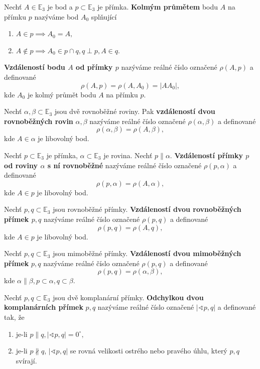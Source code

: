 \begin{definition}
    Nechť $A\in \mathbb E_3$ je bod a $p \subset \mathbb E_3$ je přímka.
    \textbf{Kolmým průmětem} bodu $A$ na přímku $p$ nazýváme bod $A_0$
    splňující
    \begin{enumerate}[$i.$]
    \item $A\in p \implies A_0=A,$
    \item $A\notin p \implies A_0 \in p \cap q, q \perp p, A \in q.$
    \end{enumerate}
    \textbf{Vzdáleností bodu $A$ od přímky $p$} nazýváme reálné číslo označené
    $\rho(A,p) $ a definované
    $$\rho(A,p) = \rho(A, A_0) = |AA_0|,$$
    kde $A_0$ je kolmý průmět bodu $A$ na přímku $p.$
\end{definition}

\begin{definition}
    Nechť $\alpha, \beta \subset \mathbb E_3$ jsou dvě rovnoběžné roviny. Pak
    \textbf{vzdáleností dvou rovnoběžných rovin} $\alpha, \beta$ nazýváme reálné
    číslo označené $\rho(\alpha, \beta)$ a definované
    $$\rho(\alpha, \beta)=\rho(A,\beta),$$
    kde $A\in\alpha$ je libovolný bod.
\end{definition}

\begin{definition}
    Nechť $p \subset \mathbb E_3$ je přímka, $\alpha \subset \mathbb E_3$ je rovina.
    Nechť $p\parallel \alpha.$ \textbf{Vzdáleností přímky $p$ od roviny $\alpha$
    s ní rovnoběžné} nazýváme reálné číslo označené $\rho(p,\alpha)$ a definované
    $$\rho(p,\alpha)=\rho(A,\alpha),$$
    kde $A\in p$ je libovolný bod.
\end{definition}

\begin{definition}
    Nechť $p,q \subset \mathbb E_3$ jsou rovnoběžné přímky. \textbf{Vzdáleností
    dvou rovnoběžných přímek $p,q$} nazýváme reálné číslo označené $\rho(p,q)$ a
    definované
    $$\rho(p,q) = \rho(A,q),$$
    kde $A\in p$ je libovolný bod.
\end{definition}

\begin{definition}
    Nechť $p,q \subset \mathbb E_3$ jsou mimoběžné přímky. \textbf{Vzdáleností dvou
    mimoběžných přímek} $p,q$ nazýváme reálné číslo označené $\rho(p,q)$ a definované
    $$\rho(p,q)=\rho(\alpha, \beta),$$
    kde $\alpha \parallel \beta, p \subset \alpha, q \subset \beta.$
\end{definition}

\begin{definition}
    Nechť $p,q \subset \mathbb E_3$ jsou dvě komplanární přímky. \textbf{Odchylkou
    dvou komplanárních přímek} $p,q$ nazýváme reálné číslo označené $|\sphericalangle
    p,q|$ a definované tak, že
    \begin{enumerate}[$i.$]
    \item je-li $p\parallel q, |\sphericalangle p,q|=0^\circ,$
   	\item je-li $p\nparallel q$, $|\sphericalangle p,q|$ se rovná velikosti ostrého nebo pravého úhlu,
        který $p,q$ svírají.
    \end{enumerate}
\end{definition}

